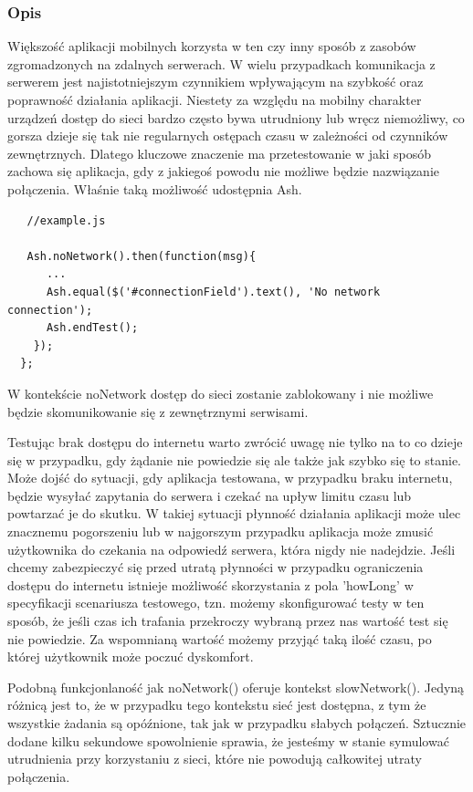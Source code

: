 \documentclass[brudnopis]{xmgr}
\begin{document}
\subsubsection{Opis}

Większość aplikacji mobilnych korzysta w ten czy inny sposób z zasobów zgromadzonych na zdalnych serwerach. W wielu przypadkach komunikacja z serwerem jest najistotniejszym  czynnikiem wpływającym na szybkość oraz poprawność działania aplikacji. Niestety za względu na mobilny charakter urządzeń dostęp do sieci bardzo często bywa utrudniony lub wręcz niemożliwy, co gorsza dzieje się tak nie regularnych ostępach czasu w zależności od czynników zewnętrznych. Dlatego kluczowe znaczenie ma przetestowanie w jaki sposób zachowa się aplikacja, gdy z jakiegoś powodu nie możliwe będzie nazwiązanie połączenia. Właśnie taką możliwość udostępnia Ash. 

\begin{lstlisting}
   //example.js

   Ash.noNetwork().then(function(msg){
      ...
      Ash.equal($('#connectionField').text(), 'No network connection');
      Ash.endTest();
    });
  };
\end{lstlisting}

W kontekście noNetwork dostęp do sieci zostanie zablokowany i nie możliwe będzie skomunikowanie się z zewnętrznymi serwisami.

Testując brak dostępu do internetu warto zwrócić uwagę nie tylko na to co dzieje się w przypadku, gdy żądanie nie powiedzie się ale także jak szybko się to stanie. Może dojść do sytuacji, gdy aplikacja testowana, w przypadku braku internetu, będzie wysyłać zapytania do serwera i czekać na upływ limitu czasu lub powtarzać je do skutku. W takiej sytuacji płynność działania aplikacji może ulec znacznemu pogorszeniu lub w najgorszym przypadku aplikacja może zmusić użytkownika do czekania na odpowiedź serwera, która nigdy nie nadejdzie. Jeśli chcemy zabezpieczyć się przed utratą płynności w przypadku ograniczenia dostępu do internetu istnieje możliwość skorzystania z pola 'howLong' w specyfikacji scenariusza testowego, tzn. możemy skonfigurować testy w ten sposób, że jeśli czas ich trafania przekroczy wybraną przez nas wartość test się nie powiedzie. Za wspomnianą wartość możemy przyjąć taką ilość czasu, po której użytkownik może poczuć dyskomfort. 

Podobną funkcjonlaność jak noNetwork() oferuje kontekst slowNetwork(). Jedyną różnicą jest to, że w przypadku tego kontekstu sieć jest dostępna, z tym że wszystkie żadania są opóźnione, tak jak w przypadku słabych połączeń. Sztucznie dodane kilku sekundowe spowolnienie sprawia, że jesteśmy w stanie symulować utrudnienia przy korzystaniu z sieci, które nie powodują całkowitej utraty połączenia. 
\end{document}
